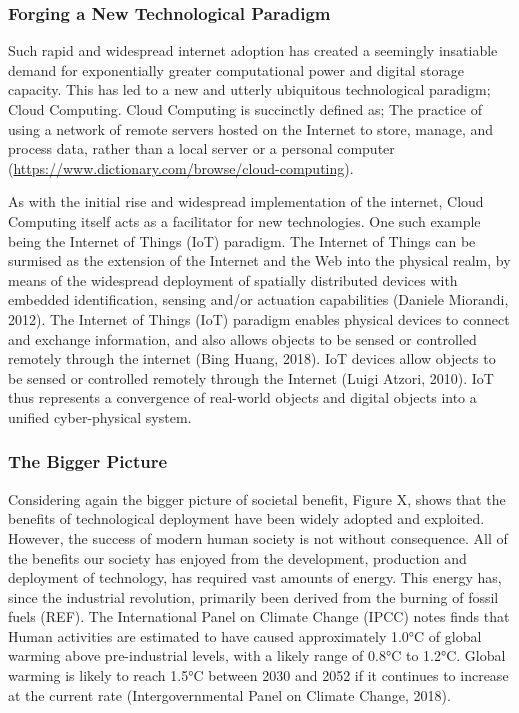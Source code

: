 \documentclass[11pt,]{article}
\begin{document}
\hypertarget{forging-a-new-technological-paradigm}{%
\subsubsection{Forging a New Technological
Paradigm}\label{forging-a-new-technological-paradigm}}

Such rapid and widespread internet adoption has created a seemingly
insatiable demand for exponentially greater computational power and
digital storage capacity. This has led to a new and utterly ubiquitous
technological paradigm; Cloud Computing. Cloud Computing is succinctly
defined as; The practice of using a network of remote servers hosted on
the Internet to store, manage, and process data, rather than a local
server or a personal computer
(\url{https://www.dictionary.com/browse/cloud-computing}).

As with the initial rise and widespread implementation of the internet,
Cloud Computing itself acts as a facilitator for new technologies. One
such example being the Internet of Things (IoT) paradigm. The Internet
of Things can be surmised as the extension of the Internet and the Web
into the physical realm, by means of the widespread deployment of
spatially distributed devices with embedded identification, sensing
and/or actuation capabilities (Daniele Miorandi, 2012). The Internet of
Things (IoT) paradigm enables physical devices to connect and exchange
information, and also allows objects to be sensed or controlled remotely
through the internet (Bing Huang, 2018). IoT devices allow objects to be
sensed or controlled remotely through the Internet (Luigi Atzori, 2010).
IoT thus represents a convergence of real-world objects and digital
objects into a unified cyber-physical system.

\hypertarget{the-bigger-picture}{%
\subsubsection{The Bigger Picture}\label{the-bigger-picture}}

Considering again the bigger picture of societal benefit, Figure X,
shows that the benefits of technological deployment have been widely
adopted and exploited. However, the success of modern human society is
not without consequence. All of the benefits our society has enjoyed
from the development, production and deployment of technology, has
required vast amounts of energy. This energy has, since the industrial
revolution, primarily been derived from the burning of fossil fuels
(REF). The International Panel on Climate Change (IPCC) notes finds that
Human activities are estimated to have caused approximately 1.0°C of
global warming above pre-industrial levels, with a likely range of 0.8°C
to 1.2°C. Global warming is likely to reach 1.5°C between 2030 and 2052
if it continues to increase at the current rate (Intergovernmental Panel
on Climate Change, 2018).
\end{document}
